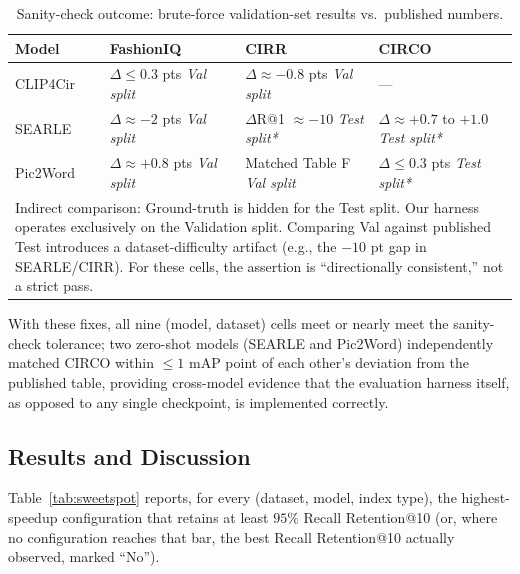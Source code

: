 \documentclass[conference]{IEEEtran}
\begin{document}
\begin{table}[!ht]
\centering
\caption{Sanity-check outcome: brute-force validation-set results vs.\ published numbers.}
\label{tab:sanitycheck}
\renewcommand{\arraystretch}{0.8}
\begin{tabularx}{\linewidth}{@{} l >{\centering\arraybackslash}X >{\centering\arraybackslash}X >{\centering\arraybackslash}X @{}}
\toprule
\textbf{Model} & \textbf{FashionIQ} & \textbf{CIRR} & \textbf{CIRCO} \\
\midrule
CLIP4Cir & $\Delta \leq 0.3$ pts \newline \textit{Val split} & $\Delta \approx -0.8$ pts \newline \textit{Val split} & --- \\
SEARLE & $\Delta \approx -2$ pts \newline \textit{Val split} & $\Delta$R@1 $\approx -10$ \newline \textit{Test split*} & $\Delta \approx +0.7$ to $+1.0$ \newline \textit{Test split*} \\
Pic2Word & $\Delta \approx +0.8$ pts \newline \textit{Val split} & Matched Table F \newline \textit{Val split} & $\Delta \leq 0.3$ pts \newline \textit{Test split*} \\
\bottomrule
\multicolumn{4}{p{0.97\linewidth}}{\vspace{0.12pt}\scriptsize *Indirect comparison: Ground-truth is hidden for the Test split. Our harness operates exclusively on the Validation split. Comparing Val against published Test introduces a dataset-difficulty artifact (e.g., the $-10$ pt gap in SEARLE/CIRR). For these cells, the assertion is ``directionally consistent,'' not a strict pass.}
\end{tabularx}
\end{table}

With these fixes, all nine (model, dataset) cells meet or nearly meet the sanity-check tolerance; two zero-shot models (SEARLE and Pic2Word) independently matched CIRCO within $\leq\!1$ mAP point of each other's deviation from the published table, providing cross-model evidence that the evaluation harness itself, as opposed to any single checkpoint, is implemented correctly.

\subsection{Results and Discussion}
\label{subsec:resultsdiscussion}
Table~\ref{tab:sweetspot} reports, for every (dataset, model, index type), the highest-speedup configuration that retains at least $95\%$ Recall Retention@10 (or, where no configuration reaches that bar, the best Recall Retention@10 actually observed, marked ``No'').
\end{document}
